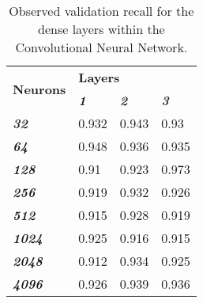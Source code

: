 \documentclass{article}
\begin{document}
\begin{table}[] \footnotesize
\centering
\caption{Observed validation recall for the dense layers within the Convolutional Neural Network.}
\label{tab:dense-recall}
\begin{tabular}{@{}llll@{}}
\toprule
\multirow{2}{*}{\textbf{Neurons}} & \multicolumn{3}{l}{\textbf{Layers}}                             \\ \cmidrule(l){2-4} 
                                  & \textit{\textbf{1}} & \textit{\textbf{2}} & \textit{\textbf{3}} \\ \cmidrule(r){1-1}
\textit{\textbf{32}}              & 0.932               & 0.943               & 0.93                \\
\textit{\textbf{64}}              & 0.948               & 0.936               & 0.935               \\
\textit{\textbf{128}}             & 0.91                & 0.923               & 0.973               \\
\textit{\textbf{256}}             & 0.919               & 0.932               & 0.926               \\
\textit{\textbf{512}}             & 0.915               & 0.928               & 0.919               \\
\textit{\textbf{1024}}            & 0.925               & 0.916               & 0.915               \\
\textit{\textbf{2048}}            & 0.912               & 0.934               & 0.925               \\
\textit{\textbf{4096}}            & 0.926               & 0.939               & 0.936               \\ \bottomrule
\end{tabular}
\end{table}
\end{document}
